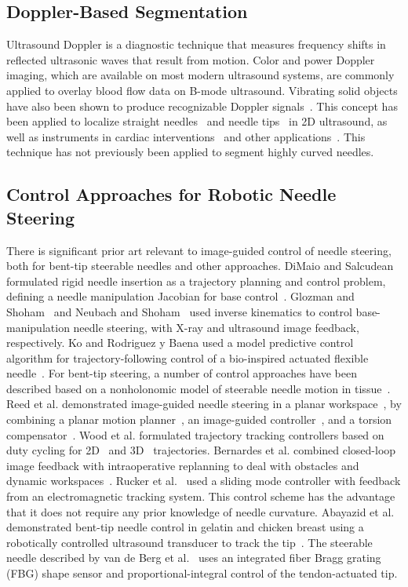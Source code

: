 \subsection{Doppler-Based Segmentation}
Ultrasound Doppler is a diagnostic technique that measures frequency shifts in reflected ultrasonic waves that result from motion. Color and power Doppler imaging, which are available on most modern ultrasound systems, are commonly applied to overlay blood flow data on B-mode ultrasound. Vibrating solid objects have also been shown to produce recognizable Doppler signals~\cite{Holen1985}. This concept has been applied to localize straight needles~\cite{Armstrong2001,Feld1997,Hamper1991} and needle tips~\cite{Harmat2006} in 2D ultrasound, as well as instruments in cardiac interventions~\cite{Fronheiser2008,Reddy2008} and other applications~\cite{McAleavey2003,Rogers2009}. This technique has not previously been applied to segment highly curved needles.

\subsection{Control Approaches for Robotic Needle Steering}
There is significant prior art relevant to image-guided control of needle steering, both for bent-tip steerable needles and other approaches. DiMaio and Salcudean formulated rigid needle insertion as a trajectory planning and control problem, defining a needle manipulation Jacobian for base control~\cite{DiMaio2005}. Glozman and Shoham~\cite{Glozman2007} and Neubach and Shoham~\cite{Neubach2010} used inverse kinematics to control base-manipulation needle steering, with X-ray and ultrasound image feedback, respectively. Ko and Rodriguez y Baena used a model predictive control algorithm for trajectory-following control of a bio-inspired actuated flexible needle~\cite{Ko2012}. For bent-tip steering, a number of control approaches have been described based on a nonholonomic model of steerable needle motion in tissue~\cite{Webster2006}. Reed et al. demonstrated image-guided needle steering in a planar workspace~\cite{Reed2011}, by combining a planar motion planner~\cite{Alterovitz2008}, an image-guided controller~\cite{Kallem2009}, and a torsion compensator~\cite{Reed2009}. Wood et al. formulated trajectory tracking controllers based on duty cycling for 2D~\cite{Wood2010} and 3D~\cite{Wood2013} trajectories. Bernardes et al. combined closed-loop image feedback with intraoperative replanning to deal with obstacles and dynamic workspaces~\cite{Bernardes2013}. Rucker et al.~\cite{Rucker2013} used a sliding mode controller with feedback from an electromagnetic tracking system. This control scheme has the advantage that it does not require any prior knowledge of needle curvature. Abayazid et al. demonstrated bent-tip needle control in gelatin and chicken breast using a robotically controlled ultrasound transducer to track the tip~\cite{Abayazid2014}. The steerable needle described by van de Berg et al.~\cite{vandeBerg2015} uses an integrated fiber Bragg grating (FBG) shape sensor and proportional-integral control of the tendon-actuated tip. 

